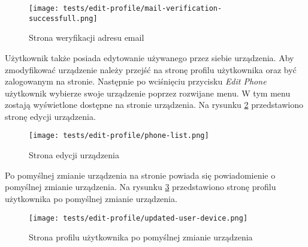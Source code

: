 \begin{figure}[H]
  \centering
  \texttt{[image: tests/edit-profile/mail-verification-successfull.png]}
  \caption{Strona weryfikacji adresu email}
  \label{verify_email_page}
\end{figure}
Użytkownik także posiada edytowanie używanego przez siebie urządzenia. Aby zmodyfikować urządzenie należy przejść na stronę profilu użytkownika oraz być zalogowanym na stronie. Następnie po wciśnięciu przycisku \textit{Edit Phone} użytkownik wybierze swoje urządzenie poprzez rozwijane menu. W tym menu zostają wyświetlone dostępne na stronie urządzenia. Na rysunku \ref{edit_phone} przedstawiono stronę edycji urządzenia.
\begin{figure}[H]
  \centering
  \texttt{[image: tests/edit-profile/phone-list.png]}
  \caption{Strona edycji urządzenia}
  \label{edit_phone}
\end{figure}
Po pomyślnej zmianie urządzenia na stronie powiada się powiadomienie o pomyślnej zmianie urządzenia. Na rysunku \ref{edit_phone_success} przedstawiono stronę profilu użytkownika po pomyślnej zmianie urządzenia.
\begin{figure}[H]
  \centering
  \texttt{[image: tests/edit-profile/updated-user-device.png]}
  \caption{Strona profilu użytkownika po pomyślnej zmianie urządzenia}
  \label{edit_phone_success}
\end{figure}

